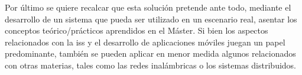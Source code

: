     Por último se quiere recalcar que esta solución pretende ante todo, mediante el desarrollo de un sistema que pueda ser utilizado en un escenario real, asentar los conceptos teórico/prácticos aprendidos en el Máster. Si bien los aspectos relacionados con la \gls{iss} y el desarrollo de aplicaciones móviles juegan un papel predominante, también se pueden aplicar en menor medida algunos relacionados con otras materias, tales como las redes inalámbricas o los sistemas distribuidos.